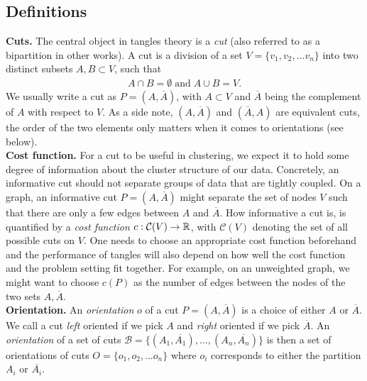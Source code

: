 \subsection{Definitions}\label{subsec-defs}
\textbf{Cuts.} The central object in tangles theory is a \textit{cut} (also referred to as a bipartition in other works). 
A cut is a division of a set $V =  \{ v_1, v_2, \ldots v_n\}$ into two distinct subsets $A, B \subset V$, such that
\begin{align}
A \cap B = \emptyset\;\text{and}\;A \cup B = V.
\end{align}
We usually write a cut as $P = \left( A, \overline{A} \right)$, with $A \subset V$ and $\overline{A}$ being the
complement of $A$ with respect to $V$. As a side note, $\left( A, \overline{A} \right)$ and $\left( \overline{A}, A \right)$ are
equivalent cuts, the order of the two elements only matters when it comes to orientations (see below). \\

\noindent
\textbf{Cost function.} For a cut to be useful in clustering, we expect it to hold some degree of information about the cluster 
structure of our data. Concretely, an informative cut should not separate groups of data that are tightly coupled.
On a graph, an informative cut $P = \left( A, \overline{A} \right)$ might separate the set of nodes $V$ such that there 
are only a few edges between $A$ and $\overline{A}$. How informative a cut is, is quantified by a \textit{cost function} $c: \mathcal{C}(V) \to \mathbb{R}$, 
with $\mathcal{C}(V)$ denoting the set of all possible cuts on $V$. 
One needs to choose an appropriate cost function beforehand and the performance of tangles will also depend on how well the cost function and the problem setting fit together. 
For example, on an unweighted graph, we might want to choose $c(P)$ as the number of edges between the nodes of the two sets $A, \overline{A}$. \\

\noindent
\textbf{Orientation.}
An \textit{orientation} $o$ of a cut $P = \left(   A, \overline{A} \right) $ is a choice of either $A$ or $\overline{A}$. We call a cut \textit{left} oriented
if we pick $A$ and \textit{right} oriented if we pick $\overline{A}$.
An \textit{orientation} of a set of cuts 
$\mathcal{B} = \{ \left(  A_1, \overline{A_1}  \right), \ldots, \left(   A_n, \overline{A_n} \right) \}$ is  
then a set of orientations of cuts $O = \{o_1, o_2, \ldots o_n\}$
where $o_i$ corresponds to either the partition $A_i$ or $\overline{A_i}$. \\

